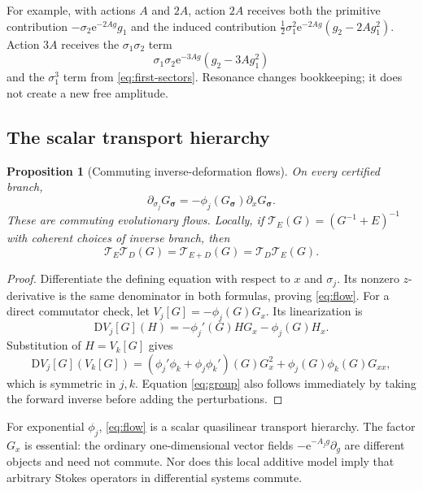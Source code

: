 \documentclass[11pt,a4paper]{article}
\numberwithin{equation}{section}
\newtheorem{proposition}[theorem]{Proposition}
\theoremstyle{definition}
\theoremstyle{remark}
\newcommand{\e}{\mathrm e}
\newcommand{\D}{\mathrm D}
\newcommand{\bs}{\boldsymbol\sigma}
\begin{document}
For example, with actions $A$ and $2A$, action $2A$ receives both the primitive contribution
$-\sigma_2\e^{-2Ag}g_1$ and the induced contribution
$\frac12\sigma_1^2\e^{-2Ag}(g_2-2Ag_1^2)$.
Action $3A$ receives the $\sigma_1\sigma_2$ term
\[
 \sigma_1\sigma_2\e^{-3Ag}(g_2-3Ag_1^2)
\]
and the $\sigma_1^3$ term from \eqref{eq:first-sectors}. Resonance changes bookkeeping; it does not create a new free amplitude.

\subsection{The scalar transport hierarchy}
\begin{proposition}[Commuting inverse-deformation flows]
\label{prop:flows}
On every certified branch,
\begin{equation}
 \partial_{\sigma_j}G_{\bs}
 =-\phi_j(G_{\bs})\partial_xG_{\bs}.
 \label{eq:flow}
\end{equation}
These are commuting evolutionary flows. Locally, if
$\mathcal T_E(G)=(G^{-1}+E)^{-1}$ with coherent choices of inverse branch, then
\begin{equation}
 \mathcal T_E\mathcal T_D(G)=\mathcal T_{E+D}(G)
 =\mathcal T_D\mathcal T_E(G).
 \label{eq:group}
\end{equation}
\end{proposition}
\begin{proof}
Differentiate the defining equation with respect to $x$ and $\sigma_j$. Its nonzero $z$-derivative is the same denominator in both formulas, proving \eqref{eq:flow}. For a direct commutator check, let
$V_j[G]=-\phi_j(G)G_x$. Its linearization is
\[
 \D V_j[G](H)=-\phi_j'(G)HG_x-\phi_j(G)H_x.
\]
Substitution of $H=V_k[G]$ gives
\[
 \D V_j[G](V_k[G])=
 (\phi_j'\phi_k+\phi_j\phi_k')(G)G_x^2
 +\phi_j(G)\phi_k(G)G_{xx},
\]
which is symmetric in $j,k$. Equation \eqref{eq:group} also follows immediately by taking the forward inverse before adding the perturbations.
\end{proof}

For exponential $\phi_j$, \eqref{eq:flow} is a scalar quasilinear transport hierarchy. The factor $G_x$ is essential: the ordinary one-dimensional vector fields $-\e^{-A_jg}\partial_g$ are different objects and need not commute. Nor does this local additive model imply that arbitrary Stokes operators in differential systems commute.
\end{document}
